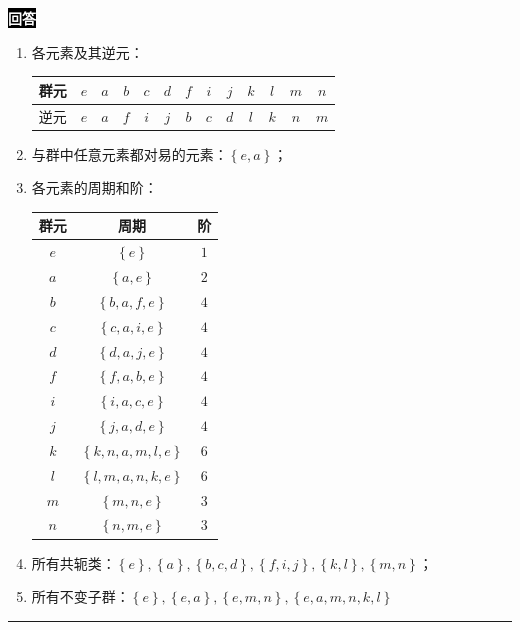 \documentclass[11pt,a4paper]{ctexart}
\newenvironment{answer}
  {\par\smallskip\noindent
   \begingroup
   \setlength{\fboxsep}{4pt}%
   \colorbox{black}{\textcolor{white}{\bfseries 回答}}%
   \endgroup
   \quad\ignorespaces}
  {\par\smallskip\noindent\rule{\linewidth}{0.4pt}\medskip}
\begin{document}
\begin{answer}
  \begin{enumerate}
    \item 各元素及其逆元：
      \begin{center}
        \begin{tabular}{c|*{12}{c}}
          群元 & $e$ & $a$ & $b$ & $c$ & $d$ & $f$ & $i$ & $j$ & $k$ & $l$ & $m$ & $n$ \\ \hline
          逆元 & $e$ & $a$ & $f$ & $i$ & $j$ & $b$ & $c$ & $d$ & $l$ & $k$ & $n$ & $m$ \\ \hline
        \end{tabular}
      \end{center}
    \item 与群中任意元素都对易的元素：$\left\{e,a \right\} $；
    \item 各元素的周期和阶：
      \begin{center}
        \begin{tabular}{c|cc}
          群元 &周期 &阶 \\ \hline
          $e $ &$\left\{e \right\} $ &$1 $ \\
          $a $ &$\left\{a,e \right\} $ &$2 $ \\
          $b $ &$\left\{b,a,f,e \right\}$ &$4 $ \\
          $c $ &$\left\{c,a,i,e \right\}$ &$4 $ \\
          $d $ &$\left\{d,a,j,e \right\}$ &$4 $ \\
          $f $ &$\left\{f,a,b,e \right\}$ &$4 $ \\
          $i $ &$\left\{i,a,c,e \right\}$ &$4 $ \\
          $j $ &$\left\{j,a,d,e \right\}$ &$4 $ \\
          $k $ &$\left\{k,n,a,m,l,e \right\}$ &$6 $ \\
          $l $ &$\left\{l,m,a,n,k,e \right\}$ &$6 $ \\
          $m $ &$\left\{m,n,e \right\}$ &$3 $ \\
          $n $ &$\left\{n,m,e \right\}$ &$3 $ \\ \hline
        \end{tabular}
      \end{center}
    \item 所有共轭类：$\left\{e \right\},\left\{a \right\},\left\{b,c,d \right\},\left\{f,i,j \right\},\left\{k,l \right\},\left\{m,n \right\} $；
    \item 所有不变子群：$\left\{e \right\},\left\{e,a \right\},\left\{e,m,n \right\},\left\{e,a,m,n,k,l \right\} $

\end{enumerate}
\end{answer}
\end{document}
